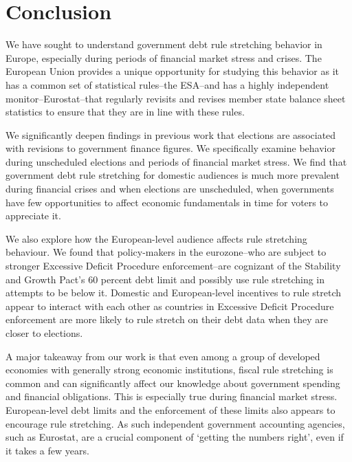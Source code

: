 \documentclass[]{article}
\begin{document}
\begin{landscape}
    
\end{landscape}


\section{Conclusion}

We have sought to understand government debt rule stretching behavior in Europe, especially during periods of financial market stress and crises. The European Union provides a unique opportunity for studying this behavior as it has a common set of statistical rules--the ESA--and has a highly independent monitor--Eurostat--that regularly revisits and revises member state balance sheet statistics to ensure that they are in line with these rules.

We significantly deepen findings in previous work that elections are associated with revisions to government finance figures. We specifically examine behavior during unscheduled elections and periods of financial market stress. We find that government debt rule stretching for domestic audiences is much more prevalent during financial crises and when elections are unscheduled, when governments have few opportunities to affect economic fundamentals in time for voters to appreciate it.

We also explore how the European-level audience affects rule stretching behaviour. We found that policy-makers in the eurozone--who are subject to stronger Excessive Deficit Procedure enforcement--are cognizant of the Stability and Growth Pact's 60 percent debt limit and possibly use rule stretching in attempts to be below it. Domestic and European-level incentives to rule stretch appear to interact with each other as countries in Excessive Deficit Procedure enforcement are more likely to rule stretch on their debt data when they are closer to elections.

A major takeaway from our work is that even among a group of developed economies with generally strong economic institutions, fiscal rule stretching is common and can significantly affect our knowledge about government spending and financial obligations. This is especially true during financial market stress. European-level debt limits and the enforcement of these limits also appears to encourage rule stretching. As such independent government accounting agencies, such as Eurostat, are a crucial component of `getting the numbers right', even if it takes a few years.
\end{document}
